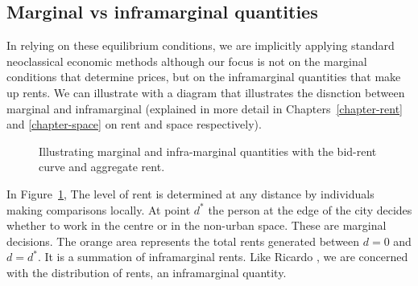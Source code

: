 \subsection{Marginal vs inframarginal quantities}
In relying on these equilibrium conditions, we are implicitly applying standard neoclassical economic methods although our focus is not on the \gls{marginal} conditions that determine prices, but on the \gls{inframarginal} quantities that make up rents. We can illustrate with a diagram that illustrates the disnction between marginal and inframarginal (explained in more detail in Chapters~\ref{chapter-rent} and \ref{chapter-space} on rent and space respectively). 

\vspace{.3cm}
\begin{figure}[h!t!]
\centering

\caption{Illustrating marginal and infra-marginal quantities with the bid-rent curve and aggregate rent.}
\label{fig-land-rent-as-inframarginal}
\end{figure}

In Figure~\ref{fig-land-rent-as-inframarginal}, The level of rent is determined at any distance by individuals making comparisons locally. At point $d^*$ the person at the edge of the city decides whether to work in the centre or in the non-urban space. These are \gls{marginal} decisions. The orange area represents the total rents generated between $d=0$ and $d=d^*$. It is a summation of \gls{inframarginal} rents. Like Ricardo \cite{ricardoEssayInfluenceLow1815}, we are concerned with the distribution of rents, an inframarginal quantity.





